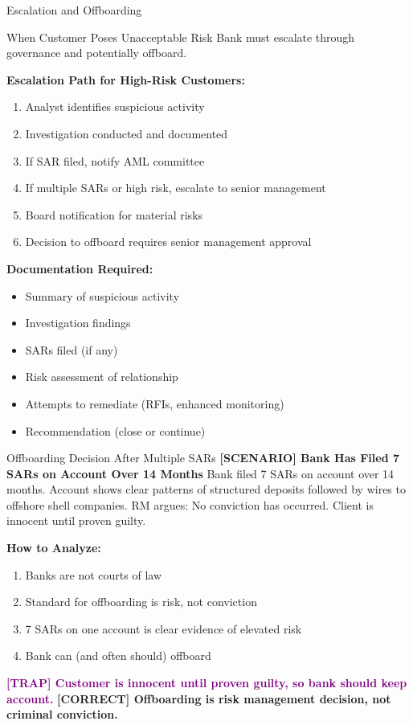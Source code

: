 \documentclass[11pt,a4paper]{beamer}
\newcommand{\trap}[1]{\textcolor{purple}{\textbf{[TRAP] #1}}}
\newcommand{\correct}[1]{\textcolor{green!50!black}{\textbf{[CORRECT] #1}}}
\newcommand{\scenario}[1]{\textcolor{blue!70!black}{\textbf{[SCENARIO] #1}}}
\begin{document}
	\begin{frame}{Escalation and Offboarding}
		\begin{block}{When Customer Poses Unacceptable Risk}
			Bank must escalate through governance and potentially offboard.
		\end{block}
		\textbf{Escalation Path for High-Risk Customers:}
		\begin{enumerate}
			\item Analyst identifies suspicious activity
			\item Investigation conducted and documented
			\item If SAR filed, notify AML committee
			\item If multiple SARs or high risk, escalate to senior management
			\item Board notification for material risks
			\item Decision to offboard requires senior management approval
		\end{enumerate}
		\textbf{Documentation Required:}
		\begin{itemize}
			\item Summary of suspicious activity
			\item Investigation findings
			\item SARs filed (if any)
			\item Risk assessment of relationship
			\item Attempts to remediate (RFIs, enhanced monitoring)
			\item Recommendation (close or continue)
		\end{itemize}
	\end{frame}
	
	\begin{frame}{Offboarding Decision After Multiple SARs}
		\scenario{Bank Has Filed 7 SARs on Account Over 14 Months}
		Bank filed 7 SARs on account over 14 months. Account shows clear patterns of structured deposits followed by wires to offshore shell companies. RM argues: No conviction has occurred. Client is innocent until proven guilty.
		
		\vspace{0.1cm}
		\textbf{How to Analyze:}
		\begin{enumerate}
			\item Banks are not courts of law
			\item Standard for offboarding is risk, not conviction
			\item 7 SARs on one account is clear evidence of elevated risk
			\item Bank can (and often should) offboard
		\end{enumerate}
		\trap{Customer is innocent until proven guilty, so bank should keep account.}
		\correct{Offboarding is risk management decision, not criminal conviction.}
	\end{frame}
	
\end{document}
